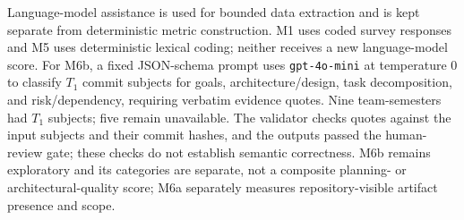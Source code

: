 Language-model assistance is used for bounded data extraction and is kept
separate from deterministic metric construction. M1 uses coded survey
responses and M5 uses deterministic lexical coding; neither receives a new
language-model score. For M6b, a fixed JSON-schema prompt uses
\texttt{gpt-4o-mini} at temperature $0$ to classify $T_1$ commit subjects for
goals, architecture/design, task decomposition, and risk/dependency, requiring
verbatim evidence quotes. Nine team-semesters had $T_1$ subjects; five remain
unavailable. The validator checks quotes against the input subjects and their
commit hashes, and the outputs passed the human-review gate; these checks do
not establish semantic correctness. M6b remains exploratory and its
categories are separate, not a composite planning- or architectural-quality
score; M6a separately measures repository-visible artifact presence and scope.
